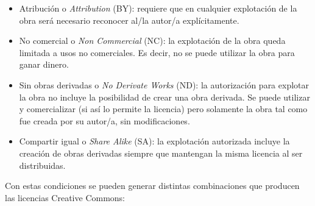 \begin{itemize}
\item Atribución o \emph{Attribution} (BY): requiere que en cualquier explotación de la obra será necesario reconocer al/la autor/a explícitamente.

\item No comercial o \emph{Non Commercial} (NC): la explotación de la obra queda limitada a usos no comerciales. Es decir, no se puede utilizar la obra para ganar dinero.

\item Sin obras derivadas o \emph{No Derivate Works} (ND): la autorización para explotar la obra no incluye la posibilidad de crear una obra derivada. Se puede utilizar y comercializar (si así lo permite la licencia) pero solamente la obra tal como fue creada por su autor/a, sin modificaciones.

\item Compartir igual o \emph{Share Alike} (SA): la explotación autorizada incluye la creación de obras derivadas siempre que mantengan la misma licencia al ser distribuidas.
\end{itemize}

Con estas condiciones se pueden generar distintas combinaciones que producen las licencias Creative Commons:

